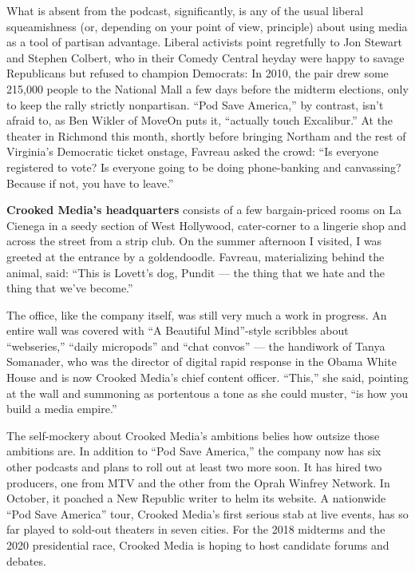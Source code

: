 What is absent from the podcast, significantly, is any of the usual
liberal squeamishness (or, depending on your point of view, principle)
about using media as a tool of partisan advantage. Liberal activists
point regretfully to Jon Stewart and Stephen Colbert, who in their
Comedy Central heyday were happy to savage Republicans but refused to
champion Democrats: In 2010, the pair drew some 215,000 people to the
National Mall a few days before the midterm elections, only to keep the
rally strictly nonpartisan. ``Pod Save America,'' by contrast, isn't
afraid to, as Ben Wikler of MoveOn puts it, ``actually touch
Excalibur.'' At the theater in Richmond this month, shortly before
bringing Northam and the rest of Virginia's Democratic ticket onstage,
Favreau asked the crowd: ``Is everyone registered to vote? Is everyone
going to be doing phone-banking and canvassing? Because if not, you have
to leave.''

\textbf{Crooked Media's headquarters} consists of a few bargain-priced
rooms on La Cienega in a seedy section of West Hollywood, cater-corner
to a lingerie shop and across the street from a strip club. On the
summer afternoon I visited, I was greeted at the entrance by a
goldendoodle. Favreau, materializing behind the animal, said: ``This is
Lovett's dog, Pundit --- the thing that we hate and the thing that we've
become.''

The office, like the company itself, was still very much a work in
progress. An entire wall was covered with ``A Beautiful Mind''-style
scribbles about ``webseries,'' ``daily micropods'' and ``chat convos''
--- the handiwork of Tanya Somanader, who was the director of digital
rapid response in the Obama White House and is now Crooked Media's chief
content officer. ``This,'' she said, pointing at the wall and summoning
as portentous a tone as she could muster, ``is how you build a media
empire.''

The self-mockery about Crooked Media's ambitions belies how outsize
those ambitions are. In addition to ``Pod Save America,'' the company
now has six other podcasts and plans to roll out at least two more soon.
It has hired two producers, one from MTV and the other from the Oprah
Winfrey Network. In October, it poached a New Republic writer to helm
its website. A nationwide ``Pod Save America'' tour, Crooked Media's
first serious stab at live events, has so far played to sold-out
theaters in seven cities. For the 2018 midterms and the 2020
presidential race, Crooked Media is hoping to host candidate forums and
debates.

